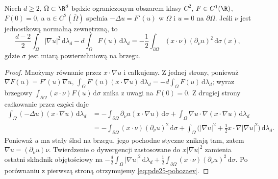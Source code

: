 \begin{lemat}
\label{lem:pde25-pohozaev}
Niech $d\ge2$, $\Omega\subset\R^d$ będzie ograniczonym
obszarem klasy $C^2$, $F\in C^1(\R)$, $F(0)=0$,
a $u\in C^2(\overline\Omega)$ spełnia
$-\Delta u=F'(u)$ w $\Omega$ i $u=0$ na $\partial\Omega$.
Jeśli $\nu$ jest jednostkową normalną zewnętrzną, to
\begin{equation}\label{eq:pde25-pohozaev}
 \frac{d-2}{2}\int_\Omega|\nabla u|^2\,\mathrm d\lambda_d
 -d\int_\Omega F(u)\,\mathrm d\lambda_d
 =-\frac12\int_{\partial\Omega}(x\cdot\nu)
 (\partial_\nu u)^2\,\mathrm d\sigma(x),
\end{equation}
gdzie $\sigma$ jest miarą powierzchniową na brzegu.
\end{lemat}
\begin{proof}
Mnożymy równanie przez $x\cdot\nabla u$ i całkujemy.
Z jednej strony, ponieważ $\nabla F(u)=F'(u)\nabla u$,
$\int_\Omega F'(u)(x\cdot\nabla u)\,\mathrm d\lambda_d
=-d\int_\Omega F(u)\,\mathrm d\lambda_d$;
wyraz brzegowy $\int_{\partial\Omega}(x\cdot\nu)F(u)
\,\mathrm d\sigma$ znika z uwagi na $F(0)=0$.
Z drugiej strony całkowanie przez części daje
\[
 \begin{aligned}
 \int_\Omega(-\Delta u)(x\cdot\nabla u)\,\mathrm d\lambda_d
 &= -\int_{\partial\Omega}\partial_\nu u
 (x\cdot\nabla u)\,\mathrm d\sigma
 +\int_\Omega\nabla u\cdot\nabla(x\cdot\nabla u)
 \,\mathrm d\lambda_d\\
 &= -\int_{\partial\Omega}(x\cdot\nu)(\partial_\nu u)^2
 \,\mathrm d\sigma
 +\int_\Omega\bigl(|\nabla u|^2
 +\tfrac12 x\cdot\nabla|\nabla u|^2\bigr)
 \,\mathrm d\lambda_d.
 \end{aligned}
\]
Ponieważ $u$ ma stały ślad na brzegu, jego pochodne
styczne znikają tam, zatem $\nabla u=(\partial_\nu u)\nu$.
Twierdzenie o dywergencji zastosowane do
$x|\nabla u|^2$ zamienia ostatni składnik objętościowy
na $-\frac d2\int_\Omega|\nabla u|^2\,
\mathrm d\lambda_d+\frac12\int_{\partial\Omega}
(x\cdot\nu)(\partial_\nu u)^2\,\mathrm d\sigma$.
Po porównaniu z pierwszą stroną otrzymujemy
\eqref{eq:pde25-pohozaev}.
\end{proof}


